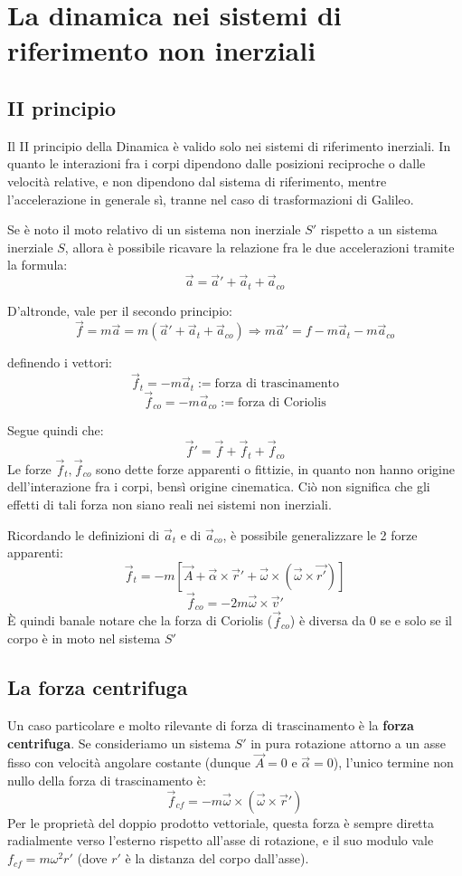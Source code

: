 \documentclass[11pt, a4paper, openright]{book}
\theoremstyle{plain}
\theoremstyle{definition}
\begin{document}
\newpage

\section{La dinamica nei sistemi di riferimento non inerziali}
\label{sec:SRNI}

\subsection{II principio}
Il II principio della Dinamica è valido solo nei sistemi di riferimento inerziali. In quanto le interazioni fra i corpi dipendono dalle posizioni reciproche o dalle velocità relative, e non dipendono dal sistema di riferimento, mentre l'accelerazione in generale sì, tranne nel caso di trasformazioni di Galileo.

Se è noto il moto relativo di un sistema non inerziale $S'$ rispetto a un sistema inerziale $S$, allora è possibile ricavare la relazione fra le due accelerazioni tramite la formula:
\[\vec{a} = \vec{a}' + \vec{a}_t + \vec{a}_{co}\]

D'altronde, vale per il secondo principio:
\[\vec{f} = m\vec{a} = m(\vec{a}' + \vec{a}_t + \vec{a}_{co}) \Longrightarrow m\vec{a}' = f -m\vec{a}_t - m\vec{a}_{co}\]

definendo i vettori:
\[\vec{f}_t = -m\vec{a}_t := \text{forza di trascinamento}\]
\[\vec{f}_{co} = -m\vec{a}_{co} := \text{forza di Coriolis}\]

Segue quindi che:
\[\vec{f}' = \vec{f} + \vec{f}_t + \vec{f}_{co}\]
Le forze $\vec{f}_t, \vec{f}_{co}$ sono dette forze apparenti o fittizie, in quanto non hanno origine dell'interazione fra i corpi, bensì origine cinematica. Ciò non significa che gli effetti di tali forza non siano reali nei sistemi non inerziali.

Ricordando le definizioni di $\vec{a}_t$ e di $\vec{a}_{co}$, è possibile generalizzare le 2 forze apparenti:
\[\vec{f}_t = -m[\vec{A} + \vec{\alpha} \times \vec{r}' + \vec{\omega}\times(\vec{\omega} \times \vec{r'})]\]
\[\vec{f}_{co} = -2m\vec{\omega} \times \vec{v}'\]
È quindi banale notare che la forza di Coriolis ($\vec{f}_{co}$) è diversa da 0 se e solo se il corpo è in moto nel sistema $S'$

\subsection{La forza centrifuga}
Un caso particolare e molto rilevante di forza di trascinamento è la \textbf{forza centrifuga}. Se consideriamo un sistema $S'$ in pura rotazione attorno a un asse fisso con velocità angolare costante (dunque $\vec{A} = 0$ e $\vec{\alpha} = 0$), l'unico termine non nullo della forza di trascinamento è:
\[\vec{f}_{cf} = -m\vec{\omega} \times (\vec{\omega} \times \vec{r}')\]
Per le proprietà del doppio prodotto vettoriale, questa forza è sempre diretta radialmente verso l'esterno rispetto all'asse di rotazione, e il suo modulo vale $f_{cf} = m\omega^2 r'$ (dove $r'$ è la distanza del corpo dall'asse).
\end{document}
